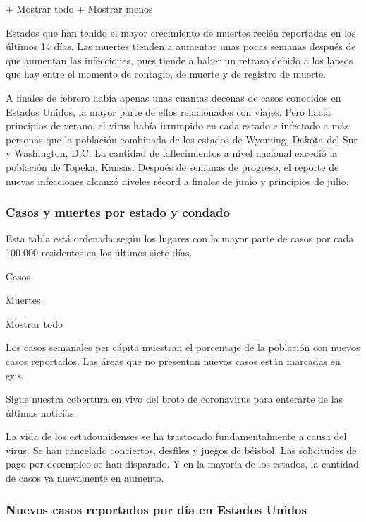+ Mostrar todo + Mostrar menos

Estados que han tenido el mayor crecimiento de muertes recién reportadas
en los últimos 14 días. Las muertes tienden a aumentar unas pocas
semanas después de que aumentan las infecciones, pues tiende a haber un
retraso debido a los lapsos que hay entre el momento de contagio, de
muerte y de registro de muerte.

A finales de febrero había apenas unas cuantas decenas de casos
conocidos en Estados Unidos, la mayor parte de ellos relacionados con
viajes. Pero hacia principios de verano, el virus había irrumpido en
cada estado e infectado a más personas que la población combinada de los
estados de Wyoming, Dakota del Sur y Washington, D.C. La cantidad de
fallecimientos a nivel nacional excedió la población de Topeka, Kansas.
Después de semanas de progreso, el reporte de nuevas infecciones alcanzó
niveles récord a finales de junio y principios de julio.

\hypertarget{casos-y-muertes-por-estado-y-condado}{%
\subsubsection{Casos y muertes por estado y
condado}\label{casos-y-muertes-por-estado-y-condado}}

Esta tabla está ordenada según los lugares con la mayor parte de casos
por cada 100.000 residentes en los últimos siete días.

Casos

Muertes

Mostrar todo

Los casos semanales per cápita muestran el porcentaje de la población
con nuevos casos reportados. Las áreas que no presentan nuevos casos
están marcadas en gris.

Sigue nuestra cobertura en vivo del brote de coronavirus para enterarte
de las últimas noticias.

La vida de los estadounidenses se ha trastocado fundamentalmente a causa
del virus. Se han cancelado conciertos, desfiles y juegos de béisbol.
Las solicitudes de pago por desempleo se han disparado. Y en la mayoría
de los estados, la cantidad de casos va nuevamente en aumento.

\hypertarget{nuevos-casos-reportados-por-duxeda-en-estados-unidos}{%
\subsubsection{Nuevos casos reportados por día en Estados
Unidos}\label{nuevos-casos-reportados-por-duxeda-en-estados-unidos}}

